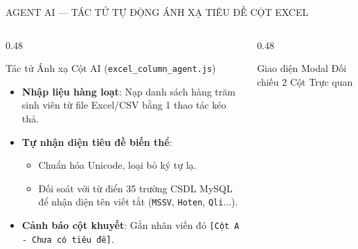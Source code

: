\documentclass[aspectratio=169, 10pt]{beamer}
\begin{document}
\begin{frame}{AGENT AI — TÁC TỬ TỰ ĐỘNG ÁNH XẠ TIÊU ĐỀ CỘT EXCEL}
  \begin{columns}[T]
    \begin{column}{0.48\textwidth}
      \begin{highlightCard}{Tác tử Ánh xạ Cột AI (\texttt{excel\_column\_agent.js})}
        \fontsize{6.8pt}{8.5pt}\selectfont
        \begin{itemize}
          \setlength{\itemsep}{1.5pt}
          \item \textbf{Nhập liệu hàng loạt}: Nạp danh sách hàng trăm sinh viên từ file Excel/CSV bằng 1 thao tác kéo thả.
          \item \textbf{Tự nhận diện tiêu đề biến thể}:
                \begin{itemize}
                  \item Chuẩn hóa Unicode, loại bỏ ký tự lạ.
                  \item Đối soát với từ điển 35 trường CSDL MySQL để nhận diện tên viết tắt (\texttt{MSSV}, \texttt{Hoten}, \texttt{Qli}...).
                \end{itemize}
          \item \textbf{Cảnh báo cột khuyết}: Gắn nhãn viền đỏ \texttt{[Cột A - Chưa có tiêu đề]}.
        \end{itemize}
      \end{highlightCard}
    \end{column}
    \begin{column}{0.48\textwidth}
      \begin{greenCard}{Giao diện Modal Đối chiếu 2 Cột Trực quan}
        \begin{center}
\end{center}
\end{greenCard}
\end{column}
\end{columns}
\end{frame}
\end{document}
